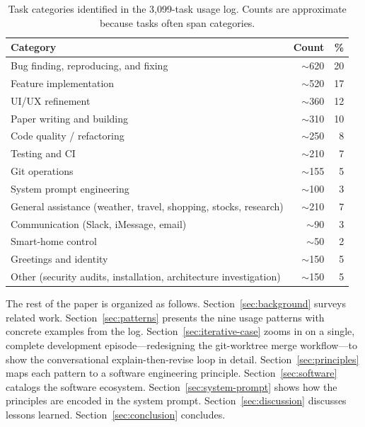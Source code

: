 \documentclass{article}
\begin{document}
\begin{table}[t]
\centering
\caption{Task categories identified in the 3,099-task usage log.
Counts are approximate because tasks often span categories.}
\label{tab:categories}
\begin{tabular}{lrr}
\toprule
\textbf{Category} & \textbf{Count} & \textbf{\%} \\
\midrule
Bug finding, reproducing, and fixing   & $\sim$620  & 20 \\
Feature implementation                 & $\sim$520  & 17 \\
UI/UX refinement                       & $\sim$360  & 12 \\
Paper writing and building             & $\sim$310  & 10 \\
Code quality / refactoring             & $\sim$250  &  8 \\
Testing and CI                         & $\sim$210  &  7 \\
Git operations                         & $\sim$155  &  5 \\
System prompt engineering              & $\sim$100  &  3 \\
General assistance (weather, travel,
  shopping, stocks, research)          & $\sim$210  &  7 \\
Communication (Slack, iMessage, email) & $\sim$90   &  3 \\
Smart-home control                     & $\sim$50   &  2 \\
Greetings and identity                 & $\sim$150  &  5 \\
Other (security audits, installation,
  architecture investigation)          & $\sim$150  &  5 \\
\bottomrule
\end{tabular}
\end{table}

The rest of the paper is organized as follows.
Section~\ref{sec:background} surveys related work.
Section~\ref{sec:patterns} presents the nine usage patterns with
concrete examples from the log.
Section~\ref{sec:iterative-case} zooms in on a single, complete
development episode---redesigning the git-worktree merge workflow---to
show the conversational explain-then-revise loop in detail.
Section~\ref{sec:principles} maps each pattern to a software
engineering principle.
Section~\ref{sec:software} catalogs the software ecosystem.
Section~\ref{sec:system-prompt} shows how the principles are
encoded in the system prompt.
Section~\ref{sec:discussion} discusses lessons learned.
Section~\ref{sec:conclusion} concludes.
\end{document}
